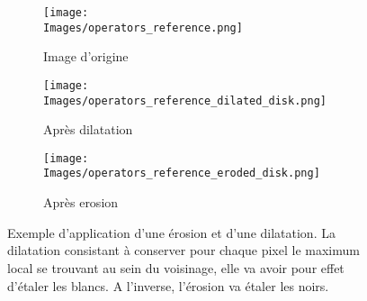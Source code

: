 \documentclass[\main/main.tex]{subfiles}
\providecommand{\Images}{\main/Figures/intro_seg}
\begin{document}
\begin{figure}[h!]
    \centering
    \begin{subfigure}[b]{0.30\textwidth}
       \caption{
       Image d'origine
            }
       \centering \texttt{[image: \\Images/operators\_reference.png]}
    \end{subfigure}
    \begin{subfigure}[b]{0.30\textwidth}
       \caption{
            Après dilatation
            }
       \centering \texttt{[image: \\Images/operators\_reference\_dilated\_disk.png]}
    \end{subfigure}
    \begin{subfigure}[b]{0.30\textwidth}
       \caption{
            Après erosion
            }
       \centering \texttt{[image: \\Images/operators\_reference\_eroded\_disk.png]}
    \end{subfigure}
    \caption{
        \label{fig:morpho:operateurs}
        Exemple d'application d'une érosion et d'une dilatation.\newline
        La dilatation consistant à conserver pour chaque pixel le maximum local se trouvant au sein du voisinage, elle va avoir pour effet d'étaler les blancs. A l'inverse, l'érosion va étaler les noirs.
    }
    
\end{figure}
\end{document}

